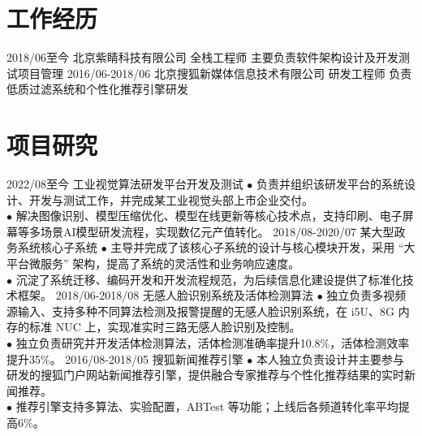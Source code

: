 \documentclass[a4paper,10pt]{professional-cv-cn}
\begin{document}
\section{工作经历}
\begin{entrylist}
  \internentry
    {2018/06至今}
    {北京紫睛科技有限公司}
    {全栈工程师}
    {主要负责软件架构设计及开发测试项目管理}
  \internentry
    {2016/06-2018/06}
    {北京搜狐新媒体信息技术有限公司}
    {研发工程师}
    {负责低质过滤系统和个性化推荐引擎研发}
\end{entrylist}

\section{项目研究}

\begin{entrylist}
  \entry
    {2022/08至今}
    {工业视觉算法研发平台开发及测试}
    {}
    {$\bullet$ 负责并组织该研发平台的系统设计、开发与测试工作，并完成某工业视觉头部上市企业交付。 \\
    $\bullet$ 解决图像识别、模型压缩优化、模型在线更新等核心技术点，支持印刷、电子屏幕等多场景AI模型研发流程，实现数亿元产值转化。}
  \entry
    {2018/08-2020/07}
    {某大型政务系统核心子系统}
    {}
    {$\bullet$ 主导并完成了该核心子系统的设计与核心模块开发，采用 “大平台微服务” 架构，提高了系统的灵活性和业务响应速度。\\
    $\bullet$ 沉淀了系统迁移、编码开发和开发流程规范，为后续信息化建设提供了标准化技术框架。}
  \entry
    {2018/06-2018/08}
    {无感人脸识别系统及活体检测算法}
    {}
    {$\bullet$ 独立负责多视频源输入、支持多种不同算法检测及报警提醒的无感人脸识别系统，在 i5U、8G 内存的标准 NUC 上，实现准实时三路无感人脸识别及控制。 \\
    $\bullet$ 独立负责研究并开发活体检测算法，活体检测准确率提升10.8\%，活体检测效率提升35\%。}
  \entry
    {2016/08-2018/05}
    {搜狐新闻推荐引擎}
    {}
    {$\bullet$ 本人独立负责设计并主要参与研发的搜狐门户网站新闻推荐引擎，提供融合专家推荐与个性化推荐结果的实时新闻推荐。 \\
    $\bullet$ 推荐引擎支持多算法、实验配置，ABTest 等功能；上线后各频道转化率平均提高6\%。}
\end{entrylist}
\end{document}
